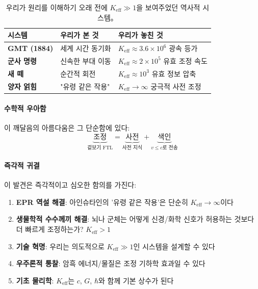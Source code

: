 \documentclass[11pt,a4paper]{article}
\begin{document}
\begin{table}[htbp]
\centering
\begin{tabular}{p{}p{}p{}}
	\toprule
	\textbf{시스템} & \textbf{우리가 본 것} & \textbf{우리가 놓친 것} \\
	\midrule
	\textbf{GMT (1884)} & 세계 시간 동기화 & $K_{\mathrm{eff}} \approx 3.6\times10^6$ 광속 등가 \\
	\textbf{군사 명령} & 신속한 부대 이동 & $K_{\mathrm{eff}} \approx 2\times10^5$ 유효 조정 속도 \\
	\textbf{새 떼} & 순간적 회전 & $K_{\mathrm{eff}} \approx 10^3$ 유효 정보 압축 \\
	\textbf{양자 얽힘} & "유령 같은 작용" & $K_{\mathrm{eff}} \to \infty$ 궁극적 사전 조정 \\
	\bottomrule
\end{tabular}
\caption{우리가 원리를 이해하기 오래 전에 $K_{\mathrm{eff}} \gg 1$을 보여주었던 역사적 시스템。}
\end{table}

\paragraph{수학적 우아함}
이 깨달음의 아름다움은 그 단순함에 있다:
\begin{equation}
\underbrace{\text{조정}}_{\text{겉보기 FTL}} = 
\underbrace{\text{사전}}_{\text{사전 지식}} + 
\underbrace{\text{색인}}_{\text{$v \leq c$로 전송}}
\end{equation}

\paragraph{즉각적 귀결}
이 발견은 즉각적이고 심오한 함의를 가진다:

\begin{enumerate}
\item \textbf{EPR 역설 해결}: 아인슈타인의 '유령 같은 작용'은 단순히 $K_{\mathrm{eff}} \to \infty$이다

\item \textbf{생물학적 수수께끼 해결}: 뇌나 군체는 어떻게 신경/화학 신호가 허용하는 것보다 더 빠르게 조정하는가? $K_{\mathrm{eff}} > 1$

\item \textbf{기술 혁명}: 우리는 의도적으로 $K_{\mathrm{eff}} \gg 1$인 시스템을 설계할 수 있다

\item \textbf{우주론적 통찰}: 암흑 에너지/물질은 조정 기하학 효과일 수 있다

\item \textbf{기초 물리학}: $K_{\mathrm{eff}}$는 $c$, $G$, $\hbar$와 함께 기본 상수가 된다
\end{enumerate}
\end{document}
